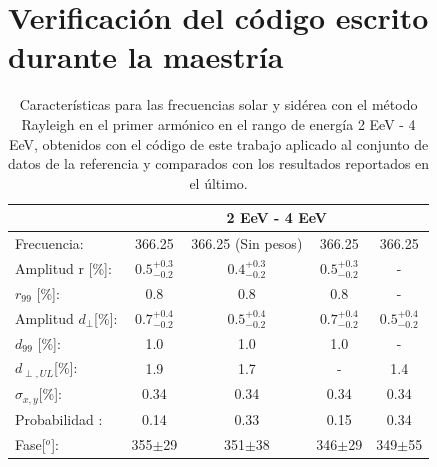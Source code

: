 \documentclass[11pt,papel,oneside,singlespace]{ibtesis}
\begin{document}
\section{Verificación del código escrito durante la maestría}


\begin{table}[H]
    \begin{small}
        \begin{center}
            \begin{tabular}[c]{l|c|c|c|c|}
                                            & \multicolumn{4}{|c|}{2 EeV - 4 EeV}                                                               \\ \hline
                Frecuencia:                 & 366.25              & 366.25 (Sin pesos)  & 366.25 \cite{codigo}    & 366.25 \cite{Aab_2020}   \\ \hline
                Amplitud r [\%]:            & $0.5^{+0.3}_{-0.2}$ & $0.4^{+0.3}_{-0.2}$ & $0.5^{+0.3}_{-0.2}$     & -                          \\
                $r_{99}$ [\%]:              & 0.8                 & 0.8                 & 0.8                     & -                          \\\hline
                Amplitud $d_\perp$[\%]:     & $0.7^{+0.4}_{-0.2}$ & $0.5^{+0.4}_{-0.2}$ & $0.7^{+0.4}_{-0.2}$ 	  & $0.5^{+0.4}_{-0.2}$                    \\
                $d_{99}$ [\%]:              & 1.0                 & 1.0                 & 1.0                     & -                         \\
                $d_{\perp,UL}$[\%]:         & 1.9                 & 1.7                 & -                       & 1.4                               \\\hline
                $\sigma_{x,y}$[\%]:         & 0.34	              & 0.34	            & 0.34	                  & 0.34                           \\
                Probabilidad      :         & 0.14                & 0.33                & 0.15               	  & 0.34                       \\
                Fase[$^o$]:                 & 355$\pm$29          & 351$\pm$38          & 346$\pm$29              & 349$\pm$55                    \\
            \end{tabular}
        \end{center}
    \end{small}
    \caption{Características para las frecuencias solar y sidérea con el método Rayleigh en el primer armónico en el rango de energía 2 EeV - 4 EeV, obtenidos con el código de este trabajo aplicado al conjunto de datos de la referencia \cite{Aab_2020} y comparados con los resultados reportados en el último.}
\end{table}
\end{document}
